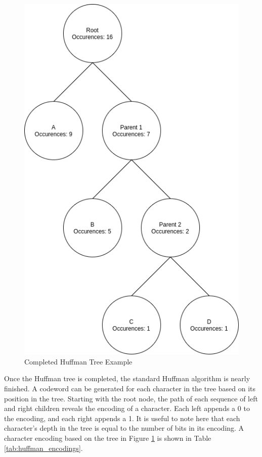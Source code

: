 \documentclass[doublespace,nopageskip]{VTthesis}
\begin{document}
\begin{figure}[htb]
	\centering
	\includegraphics[scale=0.25]{Huffman Tree Example.png}
	\caption{Completed Huffman Tree Example}
	\label{fig:completed_huffman_tree_example}
\end{figure}

Once the Huffman tree is completed, the standard Huffman algorithm is nearly finished. A codeword can be generated for each character in the tree based on its position in the tree. Starting with the root node, the path of each sequence of left and right children reveals the encoding of a character. Each left appends a 0 to the encoding, and each right appends a 1. It is useful to note here that each character's depth in the tree is equal to the number of bits in its encoding. A character encoding based on the tree in Figure \ref{fig:completed_huffman_tree_example} is shown in Table \ref{tab:huffman_encodings}.
\end{document}
